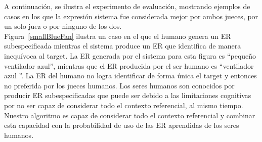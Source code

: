 A continuaci\'on, se ilustra el experimento de evaluaci\'on, mostrando ejemplos de casos en los que la expresi\'on sistema fue considerada mejor por ambos jueces, por un solo juez o por ninguno de los dos.\\

Figura~\ref{smallBlueFan} ilustra un caso en el que el humano genera un ER subespecificada mientras el sistema produce un ER que identifica de manera inequ\'{i}voca al target. La ER generada por el sistema para esta figura es ``peque\~no ventilador azul'', mientras que el ER producida por el ser humano es ``ventilador azul ''. La ER del humano no logra identificar de forma \'unica el target y entonces no preferida por los jueces humanos. Los seres humanos son conocidos por producir ER subespecificadas que puede ser debido a las limitaciones cognitivas por no ser capaz de considerar todo el contexto referencial, al mismo tiempo. Nuestro algoritmo es capaz de considerar todo el contexto referencial y combinar esta capacidad con la probabilidad de uso de las ER aprendidas de los seres humanos.


